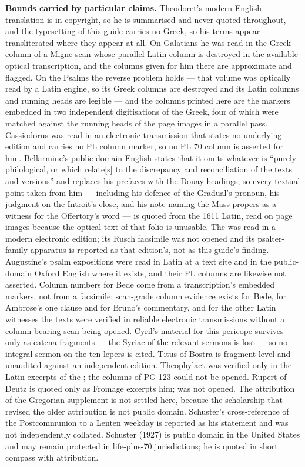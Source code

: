 \textbf{Bounds carried by particular claims.} Theodoret's modern English
translation is in copyright, so he is summarised and never quoted throughout,
and the typesetting of this guide carries no Greek, so his terms appear
transliterated where they appear at all. On Galatians he was read in the Greek
column of a Migne scan whose parallel Latin column is destroyed in the
available optical transcription, and the columns given for him there are
approximate and flagged. On the Psalms the reverse problem holds --- that
volume was optically read by a Latin engine, so its Greek columns are destroyed
and its Latin columns and running heads are legible --- and the columns printed
here are the markers embedded in two independent digitisations of the Greek,
four of which were matched against the running heads of the page images in a
parallel pass. Cassiodorus was read in an electronic transmission that states
no underlying edition and carries no PL column marker, so no PL 70 column is
asserted for him. Bellarmine's public-domain English states that it omits
whatever is ``purely philological, or which relate[s] to the discrepancy and
reconciliation of the texts and versions'' and replaces his prefaces with the
Douay headings, so every textual point taken from him --- including his defence
of the Gradual's pronoun, his judgment on the Introit's close, and his note
naming the Mass propers as a witness for the Offertory's word --- is quoted
from the 1611 Latin, read on page images because the optical text of that folio
is unusable. The  was read in a modern electronic
edition; its Rusch facsimile was not opened and its psalter-family apparatus is
reported as that edition's, not as this guide's finding.  Augustine's psalm expositions were read in Latin at a text
site and in the public-domain Oxford English where it exists, and their PL
columns are likewise not asserted. Column numbers for Bede come from
a transcription's embedded markers, not from a facsimile; scan-grade column
evidence exists for Bede, for Ambrose's one clause and for Bruno's commentary,
and for the other Latin witnesses the texts were verified in reliable
electronic transmissions without a column-bearing scan being opened. Cyril's
material for this pericope survives only as catena fragments --- the Syriac of
the relevant sermons is lost --- so no integral sermon on the ten lepers is
cited. Titus of Bostra is fragment-level and unaudited against an independent
edition. Theophylact was verified only in the Latin excerpts of the
; the columns of PG 123 could not be opened. Rupert of Deutz
is quoted only as Fromage excerpts him;  was not
opened. The attribution of the Gregorian supplement is not settled here,
because the scholarship that revised the older attribution is not public
domain. Schuster's cross-reference of the Postcommunion to a Lenten weekday is
reported as his statement and was not independently collated. Schuster (1927)
is public domain in the United States and may remain protected in life-plus-70
jurisdictions; he is quoted in short compass with attribution.


